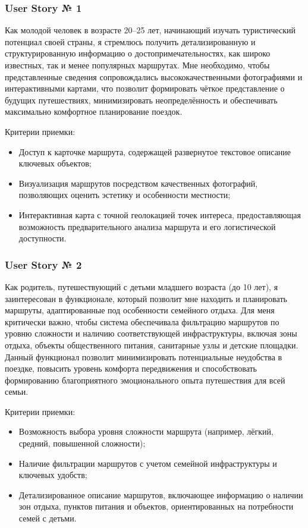 \subsubsection*{User Story № 1} 
Как молодой человек в возрасте 20–25 лет, начинающий изучать туристический потенциал своей страны, я стремлюсь получить детализированную и структурированную информацию о достопримечательностях, как широко известных, так и менее популярных маршрутах. Мне необходимо, чтобы представленные сведения сопровождались высококачественными фотографиями и интерактивными картами, что позволит формировать чёткое представление о будущих путешествиях, минимизировать неопределённость и обеспечивать максимально комфортное планирование поездок.

Критерии приемки:
\begin{itemize}
    \item 	Доступ к карточке маршрута, содержащей развернутое текстовое описание ключевых объектов;
    \item 	Визуализация маршрутов посредством качественных фотографий, позволяющих оценить эстетику и особенности местности;
    \item 	Интерактивная карта с точной геолокацией точек интереса, предоставляющая возможность предварительного анализа маршрута и его логистической доступности.
\end{itemize}

\subsubsection*{User Story № 2} 
Как родитель, путешествующий с детьми младшего возраста (до 10 лет), я заинтересован в функционале, который позволит мне находить и планировать маршруты, адаптированные под особенности семейного отдыха. Для меня критически важно, чтобы система обеспечивала фильтрацию маршрутов по уровню сложности и наличию соответствующей инфраструктуры, включая зоны отдыха, объекты общественного питания, санитарные узлы и детские площадки. Данный функционал позволит минимизировать потенциальные неудобства в поездке, повысить уровень комфорта передвижения и способствовать формированию благоприятного эмоционального опыта путешествия для всей семьи.

Критерии приемки:
\begin{itemize}
    \item 	Возможность выбора уровня сложности маршрута (например, лёгкий, средний, повышенной сложности);
    \item 	Наличие фильтрации маршрутов с учетом семейной инфраструктуры и ключевых удобств;
    \item 	Детализированное описание маршрутов, включающее информацию о наличии зон отдыха, пунктов питания и объектов, ориентированных на потребности семей с детьми.
\end{itemize}


